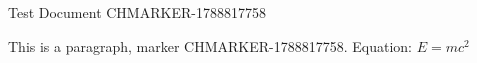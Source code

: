 \documentclass{article}
\begin{document}
Test Document CHMARKER-1788817758

This is a paragraph, marker CHMARKER-1788817758. Equation: $E = mc^2$
\end{document}
